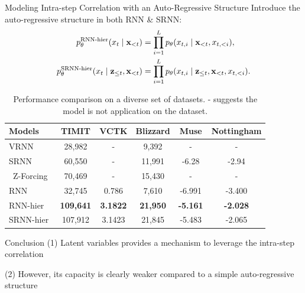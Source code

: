 \documentclass[final]{beamer}
\newlength{\colwidth}
\begin{document}
\begin{frame}[t]
\begin{columns}[t]
\begin{column}{\colwidth}
\begin{block}{Modeling Intra-step Correlation with an Auto-Regressive Structure}
	Introduce the auto-regressive structure in both RNN \& SRNN:
	\begin{align}
	\label{eqn:ar_rnn_out_dist}
	p_\theta^\text{RNN-hier}(x_t \mid {\mathbf{x}}_{<t})
	&= \prod_{i=1}^{L} p_{\theta}(x_{t,i} \mid {\mathbf{x}}_{<t}, x_{t,<i}), \\
	\label{eqn:ar_srnn_out_dist}
	p_\theta^\text{SRNN-hier}(x_t \mid {\mathbf{z}}_{\le t}, {\mathbf{x}}_{<t})
	&= \prod_{i=1}^{L} p_{\theta}(x_{t,i} \mid {\mathbf{z}}_{\le t}, {\mathbf{x}}_{<t}, x_{t,<i}).
	\end{align}
	\vspace{-1em}
	\begin{table}[!t]
		\centering
		\small
		\begin{tabular}{l|c c c | c c }
			\toprule
			\bf Models          & \bf TIMIT & \bf VCTK  & \bf Blizzard  & \bf Muse  & \bf Nottingham \\
			\midrule
			VRNN~\cite{chung2015recurrent}      & 28,982      & -          & 9,392      &  -         &  -      \\
			SRNN~\cite{fraccaro2016sequential}      & 60,550      & -          & 11,991     &  -6.28     &  -2.94     \\\
			Z-Forcing~\cite{goyal2017z}  & 70,469 & -          & 15,430     &  -         &  -       \\
			\midrule
			RNN               & 32,745      & 0.786      & 7,610     & -6.991     & -3.400     \\
			\midrule\midrule
			RNN-hier            & \textbf{109,641}     & \textbf{3.1822}     & \textbf{21,950}     & \textbf{-5.161} & \textbf{-2.028} \\
			SRNN-hier           & 107,912     & 3.1423     & 21,845     & -5.483     & -2.065    \\
			\bottomrule
		\end{tabular}
		\caption{Performance comparison on a diverse set of datasets. - suggests the model is not application on the dataset. }
		\label{tab:non_factorized}
	\end{table}
	\vspace{-1em}
\end{block}

\begin{block}{Conclusion}
	(1) Latent variables provides a mechanism to leverage the intra-step correlation
	
	(2) However, its capacity is clearly weaker compared to a simple auto-regressive structure
\end{block}


\end{column}
\end{columns}
\end{frame}
\end{document}
